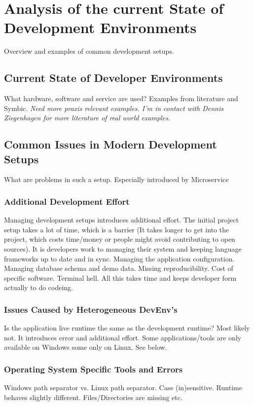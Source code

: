 \documentclass[12pt, a4paper]{article}
\begin{document}
\section{Analysis of the current State of Development Environments}\label{sec::problem}
Overview and examples of common development setups.
    \subsection{Current State of Developer Environments}
    What hardware, software and service are used? Examples from literature and Symbic. \textit{Need more praxis relevant examples. I'm in contact with Dennis Ziegenhagen for more literature of real world examples.}
    \subsection{Common Issues in Modern Development Setups}
    What are problems in such a setup. Especially introduced by Microservice
        \subsubsection{Additional Development Effort}
        Managing development setups introduces additional effort. The initial project setup takes a lot of time, which is a barrier (It takes longer to get into the project, which costs time/money or people might avoid contributing to open sources). It is developers work to managing their system and keeping language frameworks up to date and in sync. Managing the application configuration. Managing database schema and demo data. Missing reproducibility. Cost of specific software. Terminal hell. All this takes time and keeps developer form actually to do codeing.
        \subsubsection{Issues Caused by Heterogeneous DevEnv's}
        Is the application live runtime the same as the development runtime? Most likely not. It introduces error and additional effort. Some applications/tools are only available on Windows some only on Linux. See below.
        \subsubsection{Operating System Specific Tools and Errors}
        Windows path separator vs. Linux path separator. Case (in)sensitive. Runtime behaves slightly different. Files/Directories are missing etc.
\end{document}
